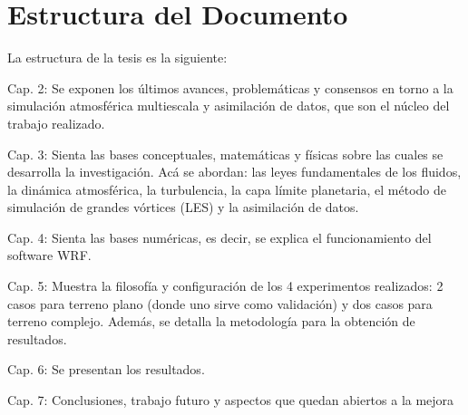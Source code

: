 \section{Estructura del Documento}
La estructura de la tesis es la siguiente:
\begin{itemize*}
	\item Cap. 2: Se exponen los últimos avances, problemáticas y consensos en torno a la simulación atmosférica multiescala y asimilación de datos, que son el núcleo del trabajo realizado.
	\item Cap. 3: Sienta las bases conceptuales, matemáticas y físicas sobre las cuales se desarrolla la investigación. Acá se abordan: las leyes fundamentales de los fluidos, la dinámica atmosférica, la turbulencia, la capa límite planetaria, el método de simulación de grandes vórtices (LES) y la asimilación de datos.
	\item Cap. 4: Sienta las bases numéricas, es decir, se explica el funcionamiento del software WRF.
	\item Cap. 5: Muestra la filosofía y configuración de los 4 experimentos realizados: 2 casos para terreno plano (donde uno sirve como validación) y dos casos para terreno complejo. Además, se detalla la metodología para la obtención de resultados.
	\item Cap. 6: Se presentan los resultados.
	\item Cap. 7: Conclusiones, trabajo futuro y aspectos que quedan abiertos a la mejora
\end{itemize*}
